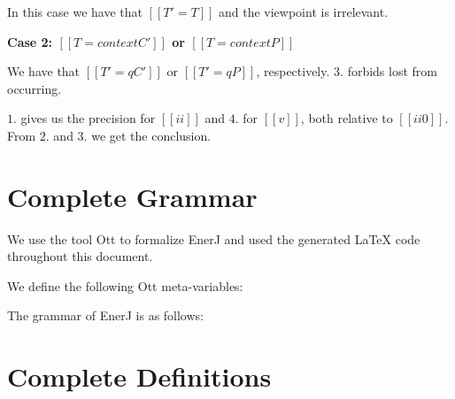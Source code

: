 \documentclass[final,10pt,twoside]{article}
\def\qed{\unskip\kern 10pt{\unitlength1pt\linethickness{.4pt}\framebox(6,6){}}}
\newcommand\proofcase[1]{\vspace{4mm plus 1mm minus 1mm}\noindent\textbf{#1}}
\begin{document}
In this case we have that $[[T' = T]]$ and the viewpoint is
irrelevant.


\proofcase{Case 2: $[[T = context C']]$ or $[[T = context P]]$}

We have that $[[T'= q C']]$ or $[[T'= q P]]$, respectively.
$3.$ forbids lost from occurring.

$1.$ gives us the precision for $[[ii]]$ and $4.$ for $[[v]]$, both
relative to $[[ii0]]$.
From $2.$ and $3.$ we get the conclusion.
\qed

{}



\newpage
\section{Complete Grammar}
\label{app:grammar}

We use the tool Ott %
to formalize EnerJ and
used the generated \LaTeX{} code throughout this document.

\medskip

\noindent
We define the following Ott meta-variables:

\medskip

\ottmetavars

\bigskip

\noindent
The grammar of EnerJ is as follows:

\medskip

\ottgrammar


\section{Complete Definitions}
\label{app:defns}

\ottdefnss
\end{document}
